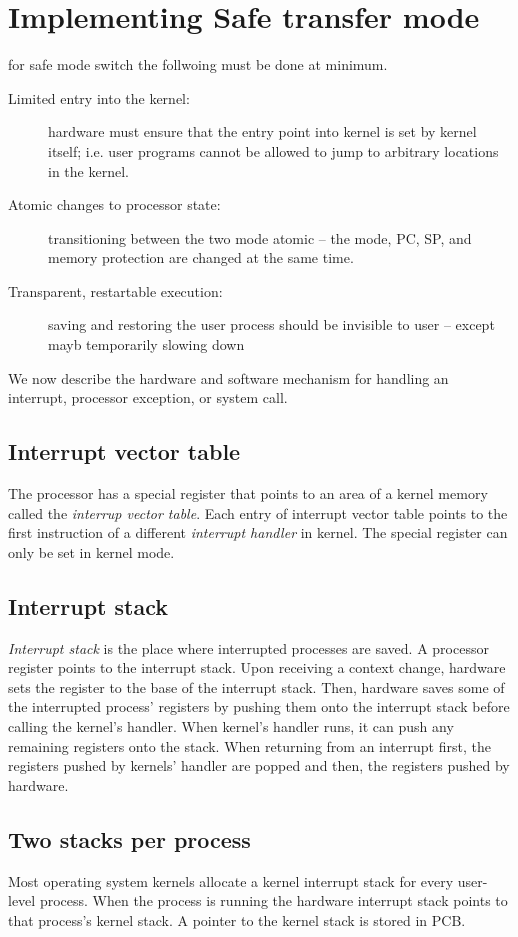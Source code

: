 \section{Implementing Safe transfer mode}
for safe mode switch the follwoing must be done at minimum. 
\begin{description}
    \item[Limited entry into the kernel:] hardware must ensure that the entry point into kernel is set by kernel itself; i.e. user programs cannot be allowed to jump to arbitrary locations in the kernel.
    \item[Atomic changes to processor state:] transitioning between the two mode atomic -- the mode, PC, SP, and memory protection are changed at the same time.
    \item[Transparent, restartable execution:] saving and restoring the user process should be invisible to user -- except mayb temporarily slowing down  
\end{description}

We now describe the hardware and software mechanism for handling an interrupt, processor exception, or system call.
\subsection{Interrupt vector table}
The processor has a special register that points to an area of a kernel memory called the \textit{interrup vector table}. Each entry of interrupt vector table points to the first instruction of a different \textit{interrupt handler} in kernel. The special register can only be set in kernel mode.

\subsection{Interrupt stack}
\textit{Interrupt stack} is the place where interrupted processes are saved.
A processor register points to the interrupt stack. Upon receiving a context change, hardware sets the register to the base of the interrupt stack. Then, hardware saves some of the interrupted process' registers by pushing them onto the interrupt stack before calling the kernel's handler. When kernel's handler runs, it can push any remaining registers onto the stack. When returning from an interrupt first, the registers pushed by kernels' handler are popped  and then, the registers pushed by hardware.

\subsection{Two stacks per process}
Most operating system kernels allocate a kernel interrupt stack for every user-level process. When the process is running the hardware interrupt stack points to that process's kernel stack. A pointer to the kernel stack is stored in PCB. 

